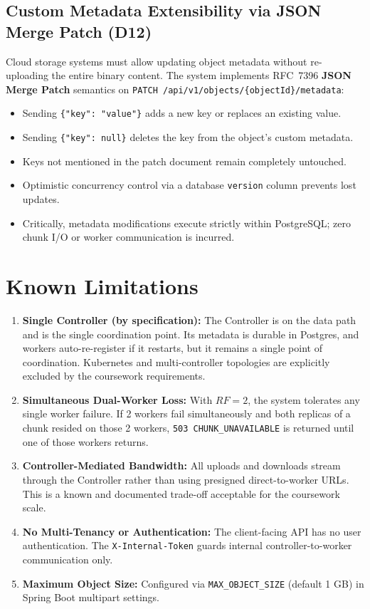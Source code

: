 \documentclass[12pt,a4paper]{report}
\begin{document}
\subsection{Custom Metadata Extensibility via JSON Merge Patch (D12)}
Cloud storage systems must allow updating object metadata without re-uploading the entire binary content. The system implements RFC~7396 \textbf{JSON Merge Patch} semantics on \texttt{PATCH /api/v1/objects/\{objectId\}/metadata}:
\begin{itemize}[leftmargin=*]
  \item Sending \texttt{\{"key": "value"\}} adds a new key or replaces an existing value.
  \item Sending \texttt{\{"key": null\}} deletes the key from the object's custom metadata.
  \item Keys not mentioned in the patch document remain completely untouched.
  \item Optimistic concurrency control via a database \texttt{version} column prevents lost updates.
  \item Critically, metadata modifications execute strictly within PostgreSQL; zero chunk I/O or worker communication is incurred.
\end{itemize}

\section{Known Limitations}

\begin{enumerate}[leftmargin=*, label=\textbf{L\arabic*.}]
  \item \textbf{Single Controller (by specification):} The Controller is on the data path and is the single coordination point. Its metadata is durable in Postgres, and workers auto-re-register if it restarts, but it remains a single point of coordination. Kubernetes and multi-controller topologies are explicitly excluded by the coursework requirements.
  \item \textbf{Simultaneous Dual-Worker Loss:} With $RF = 2$, the system tolerates any single worker failure. If 2 workers fail simultaneously and both replicas of a chunk resided on those 2 workers, \texttt{503 CHUNK\_UNAVAILABLE} is returned until one of those workers returns.
  \item \textbf{Controller-Mediated Bandwidth:} All uploads and downloads stream through the Controller rather than using presigned direct-to-worker URLs. This is a known and documented trade-off acceptable for the coursework scale.
  \item \textbf{No Multi-Tenancy or Authentication:} The client-facing API has no user authentication. The \texttt{X-Internal-Token} guards internal controller-to-worker communication only.
  \item \textbf{Maximum Object Size:} Configured via \texttt{MAX\_OBJECT\_SIZE} (default 1 GB) in Spring Boot multipart settings.
\end{enumerate}
\end{document}
